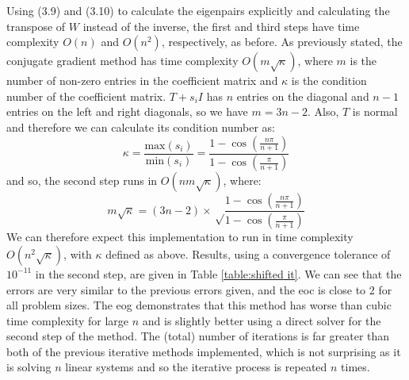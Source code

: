 \documentclass[11pt]{article}
\numberwithin{equation}{section}
\begin{document}
Using (3.9) and (3.10) to calculate the eigenpairs explicitly and calculating the transpose of $W$ instead of the inverse, the first and third steps have time complexity $O(n)$ and $O(n^2)$, respectively, as before. As previously stated, the conjugate gradient method has time complexity $O(m\sqrt{\kappa})$, where $m$ is the number of non-zero entries in the coefficient matrix and $\kappa$ is the condition number of the coefficient matrix. $T+s_i I$ has $n$ entries on the diagonal and $n-1$ entries on the left and right diagonals, so we have $m=3n-2$. Also, $T$ is normal and therefore we can calculate its condition number as:
\begin{equation}
\kappa = \frac{\text{max}(s_i)}{\text{min}(s_i)} = \frac{1-\cos \left(\frac{n \pi}{n+1} \right)}{1-\cos \left(\frac{\pi}{n+1} \right)}
\end{equation}
and so, the second step runs in $O(n m\sqrt{\kappa})$, where:
\begin{equation}
m\sqrt{\kappa} = (3n-2) \times \sqrt \frac{1-\cos \left(\frac{n \pi}{n+1} \right)}{1-\cos \left(\frac{\pi}{n+1} \right)}
\end{equation}
We can therefore expect this implementation to run in time complexity $O(n^2 \sqrt{\kappa})$, with $\kappa$ defined as above. Results, using a convergence tolerance of $10^{-11}$ in the second step, are given in Table \ref{table:shifted it}. We can see that the errors are very similar to the previous errors given, and the eoc is close to 2 for all problem sizes. The eog demonstrates that this method has worse than cubic time complexity for large $n$ and is slightly better using a direct solver for the second step of the method. The (total) number of iterations is far greater than both of the previous iterative methods implemented, which is not surprising as it is solving $n$ linear systems and so the iterative process is repeated $n$ times. 
\end{document}
